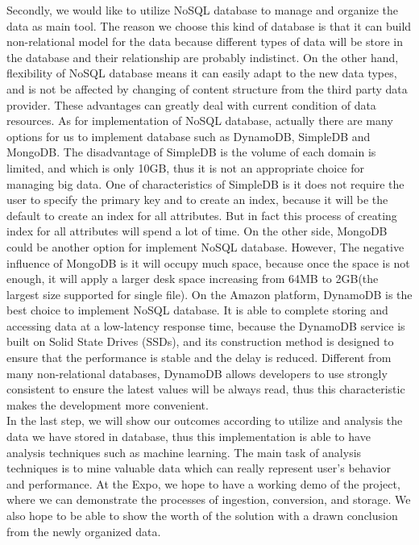 \documentclass[letterpaper,10pt]{article}
\begin{document}
    \noindent Secondly, we would like to utilize NoSQL database to manage and organize the data as main tool. The reason we choose this kind of database is that it can build non-relational model for the data because different types of data will be store in the database and their relationship are probably indistinct. On the other hand, flexibility of NoSQL database means it can easily adapt to the new data types, and is not be affected by changing of content structure from the third party data provider. These advantages can greatly deal with current condition of data resources. As for implementation of NoSQL database, actually there are many options for us to implement database such as DynamoDB, SimpleDB and MongoDB. The disadvantage of SimpleDB is the volume of each domain is limited, and which is only 10GB, thus it is not an appropriate choice for managing big data. One of characteristics of SimpleDB is it does not require the user to specify the primary key and to create an index, because it will be the default to create an index for all attributes. But in fact this process of creating index for all attributes will spend a lot of time. On the other side, MongoDB could be another option for implement NoSQL database. However, The negative influence of MongoDB is it will occupy much space, because once the space is not enough, it will apply a larger desk space increasing from 64MB to 2GB(the largest size supported for single file). On the Amazon platform, DynamoDB is the best choice to implement NoSQL database. It is able to complete storing and accessing data at a low-latency response time, because the DynamoDB service is built on Solid State Drives (SSDs), and its construction method is designed to ensure that the performance is stable and the delay is reduced. Different from many non-relational databases, DynamoDB allows developers to use strongly consistent to ensure the latest values will be always read, thus this characteristic makes the development more convenient.\\

    \noindent In the last step, we will show our outcomes according to utilize and analysis the data we have stored in database, thus this implementation is able to have analysis techniques such as machine learning. The main task of analysis techniques is to mine valuable data which can really represent user’s behavior and performance. At the Expo, we hope to have a working demo of the project, where we can demonstrate the processes of ingestion, conversion, and storage. We also hope to be able to show the worth of the solution with a drawn conclusion from the newly organized data.
\end{document}
